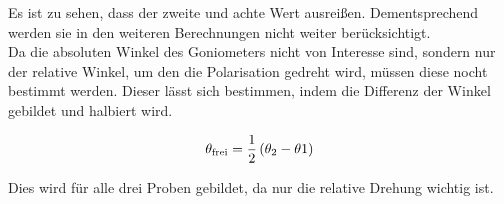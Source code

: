 
\noindent Es ist zu sehen, dass der zweite und achte Wert ausreißen. Dementsprechend werden sie in den 
weiteren Berechnungen nicht weiter berücksichtigt.\\
\noindent Da die absoluten Winkel des Goniometers nicht von Interesse sind, sondern nur der relative 
Winkel, um den die Polarisation gedreht wird, müssen diese nocht bestimmt werden. Dieser lässt sich 
bestimmen, indem die Differenz der Winkel gebildet und halbiert wird.

\begin{equation}
    \centering
    \theta_\text{frei}=\frac{1}{2} \left(\theta_2 - \theta 1 \right)
    \label{eqn:theta_frei}
\end{equation}

\noindent Dies wird für alle drei Proben gebildet, da nur die relative Drehung wichtig ist. 
  



